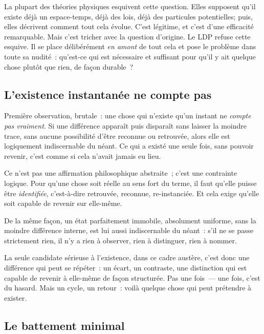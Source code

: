 \documentclass[12pt, a4paper, openright]{book}
\begin{document}
\medskip

La plupart des théories physiques esquivent cette question. Elles supposent qu'il existe déjà un espace-temps, déjà des lois, déjà des particules potentielles; puis, elles décrivent comment tout cela évolue. C'est légitime, et c'est d'une efficacité remarquable. Mais c'est tricher avec la question d'origine. Le LDP refuse cette esquive. Il se place délibérément \emph{en amont} de tout cela et pose le problème dans toute sa nudité~: qu'est-ce qui est nécessaire et suffisant pour qu'il y ait quelque chose plutôt que rien, de façon durable~?

\subsection*{L'existence instantanée ne compte pas}

Première observation, brutale~: une chose qui n'existe qu'un instant ne \emph{compte pas vraiment}. Si une différence apparaît puis disparaît sans laisser la moindre trace, sans aucune possibilité d'être reconnue ou retrouvée, alors elle est logiquement indiscernable du néant. Ce qui a existé une seule fois, sans pouvoir revenir, c'est comme si cela n'avait jamais eu lieu.

\medskip

Ce n'est pas une affirmation philosophique abstraite~; c'est une contrainte logique. Pour qu'une chose soit réelle au sens fort du terme, il faut qu'elle puisse être \emph{identifiée}, c'est-à-dire retrouvée, reconnue, re-instanciée. Et cela exige qu'elle soit capable de revenir sur elle-même.

\medskip

De la même façon, un état parfaitement immobile, absolument uniforme, sans la moindre différence interne, est lui aussi indiscernable du néant~: s'il ne se passe strictement rien, il n'y a rien à observer, rien à distinguer, rien à nommer.

\medskip

La seule candidate sérieuse à l'existence, dans ce cadre austère, c'est donc une différence qui peut se répéter~: un écart, un contraste, une distinction qui est capable de revenir à elle-même de façon structurée. Pas une fois~--- une fois, c'est du hasard. Mais un cycle, un retour~: voilà quelque chose qui peut prétendre à exister.

\subsection*{Le battement minimal}
\end{document}
